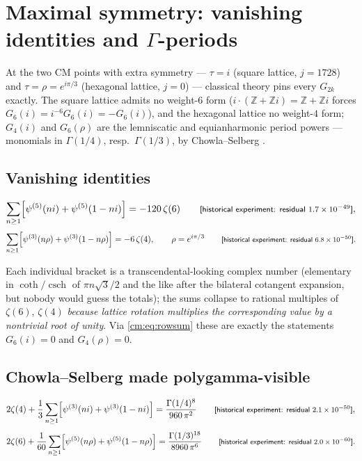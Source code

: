 \section{Maximal symmetry: vanishing identities and \texorpdfstring{$\Gamma$}{Gamma}-periods}
\label{cm:sec:maximal}

At the two CM points with extra symmetry --- $\tau=i$ (square lattice, $j=1728$) and
$\tau=\rho=e^{i\pi/3}$ (hexagonal lattice, $j=0$) --- classical theory pins every $G_{2k}$
exactly. The square lattice admits no weight-$6$ form ($i\cdot(\mathbb{Z}+\mathbb{Z}i)
=\mathbb{Z}+\mathbb{Z}i$ forces $G_6(i)=i^{-6}G_6(i)=-G_6(i)$), and the hexagonal lattice no
weight-$4$ form; $G_4(i)$ and $G_6(\rho)$ are the lemniscatic and equianharmonic period
powers --- monomials in $\Gamma(1/4)$, resp.\ $\Gamma(1/3)$, by Chowla--Selberg \cite{cm:ChowlaSelberg}.

\subsection{Vanishing identities}

\begin{result}\label{cm:res:vanishing}
\[
\sum_{n\ge 1}\Bigl[\psi^{(5)}(ni)+\psi^{(5)}(1-ni)\Bigr]=-120\,\zeta(6)
\qquad\text{\textsf{\footnotesize[historical experiment: residual $1.7\times10^{-49}$]}},
\]
\[
\sum_{n\ge 1}\Bigl[\psi^{(3)}(n\rho)+\psi^{(3)}(1-n\rho)\Bigr]=-6\,\zeta(4),
\qquad \rho=e^{i\pi/3}
\qquad\text{\textsf{\footnotesize[historical experiment: residual $6.8\times10^{-50}$]}}.
\]
\end{result}

Each individual bracket is a transcendental-looking complex number (elementary in
$\coth/\operatorname{csch}$ of $\pi n\sqrt3/2$ and the like after the bilateral cotangent
expansion, but nobody would guess the totals); the sums collapse to rational multiples of
$\zeta(6)$, $\zeta(4)$ \emph{because lattice rotation multiplies the corresponding value by a nontrivial root of unity}. Via
\eqref{cm:eq:rowsum} these are exactly the statements $G_6(i)=0$ and $G_4(\rho)=0$.

\subsection{Chowla--Selberg made polygamma-visible}

\begin{result}\label{cm:res:periods}
\[
2\zeta(4)+\frac13\sum_{n\ge 1}\Bigl[\psi^{(3)}(ni)+\psi^{(3)}(1-ni)\Bigr]
=\frac{\Gamma(1/4)^8}{960\,\pi^2}
\qquad\text{\textsf{\footnotesize[historical experiment: residual $2.1\times10^{-50}$]}},
\]
\[
2\zeta(6)+\frac1{60}\sum_{n\ge 1}\Bigl[\psi^{(5)}(n\rho)+\psi^{(5)}(1-n\rho)\Bigr]
=\frac{\Gamma(1/3)^{18}}{8960\,\pi^6}
\qquad\text{\textsf{\footnotesize[historical experiment: residual $2.0\times10^{-60}$]}}.
\]
\end{result}

